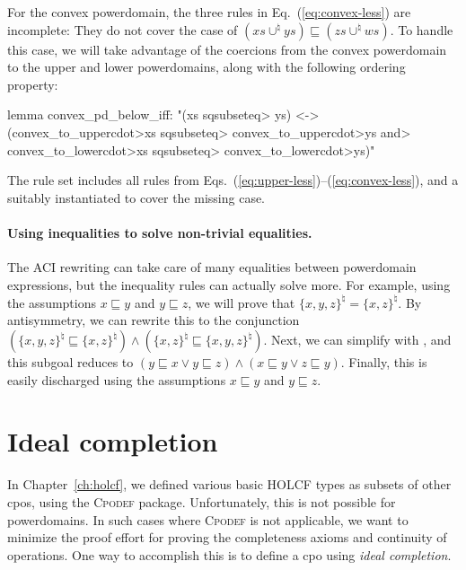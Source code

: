 For the convex powerdomain, the three rules in Eq.~(\ref{eq:convex-less}) are incomplete: They do not cover the case of $(xs\cup^{\natural}ys)\sqsubseteq(zs\cup^{\natural}ws)$. To handle this case, we will take advantage of the coercions from the convex powerdomain to the upper and lower powerdomains, along with the following ordering property:
%
\begin{isacode}
lemma convex_pd_below_iff:
  "(xs \<sqsubseteq> ys) <->
      (convex_to_upper\<cdot>xs \<sqsubseteq> convex_to_upper\<cdot>ys \<and>
        convex_to_lower\<cdot>xs \<sqsubseteq> convex_to_lower\<cdot>ys)"
\end{isacode}
%
The rule set  includes all rules from Eqs.~(\ref{eq:upper-less})--(\ref{eq:convex-less}), and a suitably instantiated  to cover the missing case.

\paragraph{Using inequalities to solve non-trivial equalities.} The ACI rewriting can take care of many equalities between powerdomain expressions, but the inequality rules can actually solve more. For example, using the assumptions $x \sqsubseteq y$ and $y \sqsubseteq z$, we will prove that $\{x, y, z\}^\natural = \{x, z\}^\natural$. By antisymmetry, we can rewrite this to the conjunction $(\{x,y,z\}^{\natural}\sqsubseteq\{x,z\}^{\natural})\wedge(\{x,z\}^{\natural}\sqsubseteq\{x,y,z\}^{\natural})$. Next, we can simplify with , and this subgoal reduces to $(y\sqsubseteq x\vee y\sqsubseteq z)\wedge(x\sqsubseteq y\vee z\sqsubseteq y)$. Finally, this is easily discharged using the assumptions $x\sqsubseteq y$ and $y\sqsubseteq z$.


\section{Ideal completion}
\label{sec:pd-ideal-completion}

In Chapter~\ref{ch:holcf}, we defined various basic HOLCF types as subsets of other cpos, using the \textsc{Cpodef} package. Unfortunately, this is not possible for powerdomains. In such cases where \textsc{Cpodef} is not applicable, we want to minimize the proof effort for proving the completeness axioms and continuity of operations. One way to accomplish this is to define a cpo using \emph{ideal completion}.

